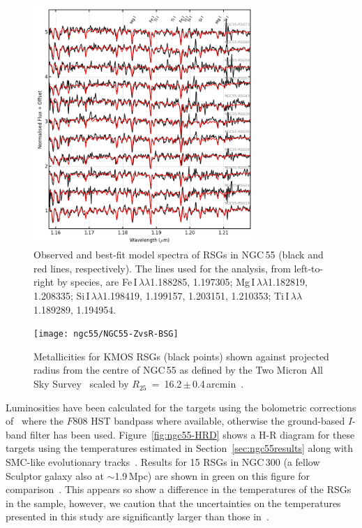 \begin{figure}
 \begin{center}
 \centering
\includegraphics[width=0.75\textwidth]{ngc55/NGC55-model-fits}
\caption[Observed and best-fit model spectra of RSGs in NGC\,55]{Observed and best-fit model spectra of RSGs in NGC\,55 (black and red lines, respectively).
The lines used for the analysis, from left-to-right by species, are
Fe\,{\scriptsize I}$\,\lambda\lambda$1.188285,
1.197305;
Mg\,{\scriptsize I}$\,\lambda\lambda$1.182819,
1.208335;
Si\,{\scriptsize I}$\,\lambda\lambda$1.198419,
1.199157,
1.203151,
1.210353;
Ti\,{\scriptsize I}$\,\lambda\lambda$1.189289,
1.194954.\label{fig:model_fits}}
\end{center}
\end{figure}


\begin{figure}
 \centering
 \texttt{[image: ngc55/NGC55-ZvsR-BSG]}
 \caption[Metallicities for KMOS targets shown against projected radius]{
 Metallicities for KMOS RSGs (black points) shown against projected radius from the centre of NGC\,55 as defined by the Two Micron All Sky Survey~\citep[2MASS;][]{2006AJ....131.1163S} scaled by $R_{25}$~=~16.2\,$\pm$\,0.4\,arcmin~\citep{1991rc3..book.....D}.}
 \label{fig:ngc55ZvsR}
\end{figure}

Luminosities have been calculated for the targets using the bolometric corrections of~\citep{2013ApJ...767....3D} where the $F808$ HST bandpass where available,
otherwise the ground-based $I$-band filter has been used.
Figure~\ref{fig:ngc55-HRD} shows a H-R diagram for these targets using the temperatures estimated in Section~\ref{sec:ngc55results} along with SMC-like evolutionary tracks~\citep{2013A&A...558A.103G}.
Results for 15 RSGs in NGC\,300 (a fellow Sculptor galaxy also at $\sim$1.9\,Mpc) are shown in green on this figure for comparison~\citep{2015ApJ...805..182G}.
This appears so show a difference in the temperatures of the RSGs in the sample, however, we caution that the uncertainties on the temperatures presented in this study are significantly larger than those in~\citep{2015ApJ...805..182G}.

